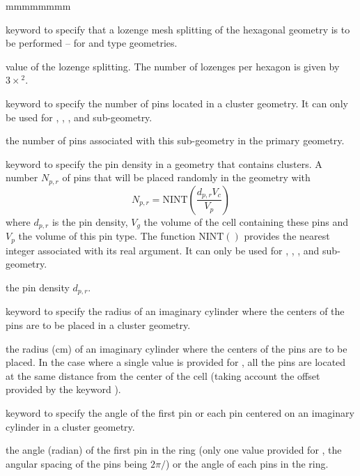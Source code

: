 \begin{ListeDeDescription}{mmmmmmmm}
\item[\moc{SPLITL}] keyword to specify that a lozenge mesh splitting of the hexagonal geometry is to be performed -- for  and  type geometries.

\item[\dusa{ispltl}] value of the lozenge splitting. The number of lozenges per hexagon is given by $3 \times$$^2$.

\item[\moc{NPIN}] keyword to specify the number of pins located in a cluster geometry. It can only be used for , , ,  and  sub-geometry.

\item[\dusa{npins}] the number of pins associated with this sub-geometry in the primary geometry. 

\item[\moc{DPIN}] keyword to specify the pin density in a geometry that contains clusters. A number $N_{p,r}$ of pins that will be placed randomly in the geometry with
$$
N_{p,r}=\textrm{NINT}\left(\frac{d_{p,r}V_{c}}{V_{p}}\right)
$$
where $d_{p,r}$ is the pin density, $V_{g}$ the volume of the cell containing these pins and$V_{p}$ the volume of this pin type. The function $\textrm{NINT}()$ provides the nearest integer associated with its real argument. It can only be used for , , ,  and  sub-geometry.

\item[\dusa{dpins}] the pin density $d_{p,r}$. 

\item[\moc{RPIN}] keyword to specify the radius of an imaginary cylinder where the centers of the pins are to be placed in a cluster geometry.

\item[\dusa{rpins}] the radius (cm) of an imaginary cylinder where the centers of the pins are to be placed. In the case where a single value is provided for , all the pins are located at the same distance from the center of the cell (taking account the offset provided by the keyword ). 

\item[\moc{APIN}] keyword to specify the angle of the first pin or each pin centered on an imaginary cylinder in a cluster geometry. 

\item[\dusa{apins}] the angle (radian) of the first pin in the ring (only one value provided for , the angular spacing of the pins being $2\pi/$) or the angle of each pins in the ring.


\end{ListeDeDescription}
